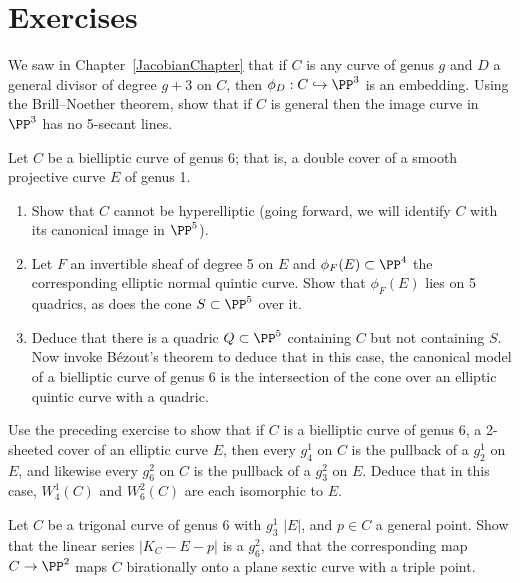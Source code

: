 {\section{Exercises}

\begin{exercise}
\label{out of place}
We saw in Chapter~\ref{JacobianChapter} that if $C$ is any curve of genus
$g$ and $D$ a general divisor of degree $g+3$ on $C$, then $\phi_D :
C \hookrightarrow \PP^3$ is an embedding. Using the Brill--Noether
theorem, show that if $C$ is general then the image curve in $\PP^3$
has no 5-secant lines.
\end{exercise}

\begin{exercise}
Let $C$ be a bielliptic curve of genus 6; that is, a double cover of a
%
smooth projective curve $E$ of genus 1.
\begin{enumerate}
\item Show that $C$ cannot be hyperelliptic (going forward, we will
identify $C$ with its canonical image in $\PP^5$).
\item Let $F$ an invertible sheaf of degree 5 on $E$ and $\phi_F(E)
\subset \PP^4$ the corresponding elliptic normal quintic curve. Show that
$\phi_F(E)$ lies on 5 quadrics, as does the cone $S \subset \PP^5$ over it.
\item Deduce that there is a quadric $Q \subset \PP^5$ containing $C$
but not containing $S$. Now invoke B\'ezout's theorem to deduce that in
this case, the canonical model of a bielliptic curve of genus 6 is the
intersection of the cone over an elliptic quintic curve with a quadric.
\end{enumerate}\label{tnih12.2}
\end{exercise}

\begin{exercise}
Use the preceding exercise to show that if $C$ is a bielliptic curve of
genus 6, a 2-sheeted cover of an elliptic curve $E$, then every $g^1_4$
on $C$ is the pullback of a $g^1_2$ on $E$, and likewise  every $g^2_6$
on $C$ is the pullback of a $g^2_3$ on $E$. Deduce that in this case,
$W^1_4(C)$ and $W^2_6(C)$ are each isomorphic to $E$.
\end{exercise}

\begin{exercise}
Let $C$ be a trigonal curve of genus 6 with $g^1_3$ $|E|$, and $p \in C$
a general point. Show that the linear series $|K_C - E-p|$ is a $g^2_6$,
and that the corresponding map $C \to \PP^2$ maps $C$ birationally onto
a plane sextic curve with a triple point.
\end{exercise}

}
